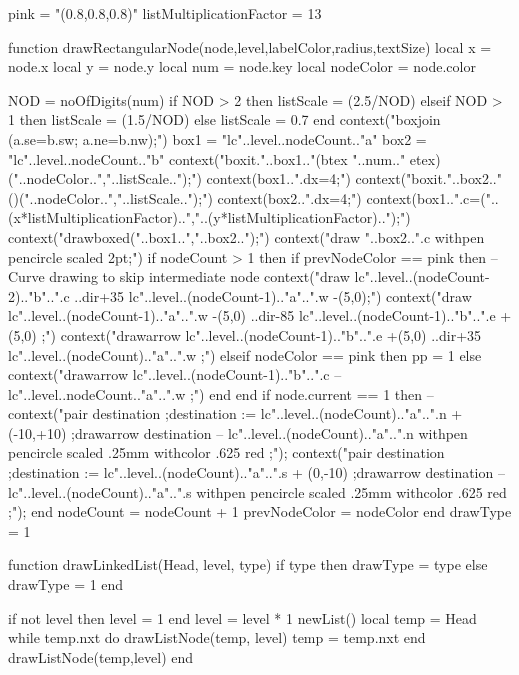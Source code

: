 pink = "(0.8,0.8,0.8)"
listMultiplicationFactor = 13

function drawRectangularNode(node,level,labelColor,radius,textSize)
	local x = node.x
	local y = node.y
	local num = node.key
	local nodeColor = node.color

	NOD = noOfDigits(num)
	if NOD > 2 then
		listScale = (2.5/NOD)
	elseif  NOD > 1 then
		listScale = (1.5/NOD)
	else
		listScale = 0.7
	end
	context("boxjoin (a.se=b.sw; a.ne=b.nw);")
	box1 = "lc"..level..nodeCount.."a"
	box2 = "lc"..level..nodeCount.."b"
	context("boxit."..box1.."(btex "..num.." etex)("..nodeColor..","..listScale..");")
	context(box1..".dx=4;")
	context("boxit."..box2.."()("..nodeColor..","..listScale..");")
	context(box2..".dx=4;")
	context(box1..".c=("..(x*listMultiplicationFactor)..","..(y*listMultiplicationFactor)..");")
	context("drawboxed("..box1..","..box2..");")
	context("draw "..box2..".c withpen pencircle scaled 2pt;")
	if nodeCount > 1 then 
		if prevNodeColor == pink then
			--Curve drawing to skip intermediate node
			context("draw lc"..level..(nodeCount-2).."b"..".c ..{dir+35} lc"..level..(nodeCount-1).."a"..".w -(5,0);")	
			context("draw lc"..level..(nodeCount-1).."a"..".w -(5,0) ..{dir-85} lc"..level..(nodeCount-1).."b"..".e +(5,0) ;")	
			context("drawarrow lc"..level..(nodeCount-1).."b"..".e +(5,0) ..{dir+35} lc"..level..(nodeCount).."a"..".w ;")	
		elseif nodeColor == pink then
			pp = 1
		else
			context("drawarrow lc"..level..(nodeCount-1).."b"..".c -- lc"..level..nodeCount.."a"..".w ;")
		end
	end
	if node.current == 1 then
		--context("pair destination ;destination := lc"..level..(nodeCount).."a"..".n + (-10,+10) ;drawarrow destination -- lc"..level..(nodeCount).."a"..".n withpen pencircle scaled .25mm withcolor .625 red ;");
		context("pair destination ;destination := lc"..level..(nodeCount).."a"..".s + (0,-10) ;drawarrow destination -- lc"..level..(nodeCount).."a"..".s withpen pencircle scaled .25mm withcolor .625 red ;");
	end
	nodeCount = nodeCount + 1
	prevNodeColor = nodeColor
end
drawType = 1

function drawLinkedList(Head, level, type)
	if type then 
		drawType = type
	else
		drawType = 1
	end

	if not level then
		level = 1
	end
	level = level * 1
	newList()
	local temp = Head
	while temp.nxt do
		drawListNode(temp, level)
		temp = temp.nxt
	end
	drawListNode(temp,level)
end
\stopluacode
